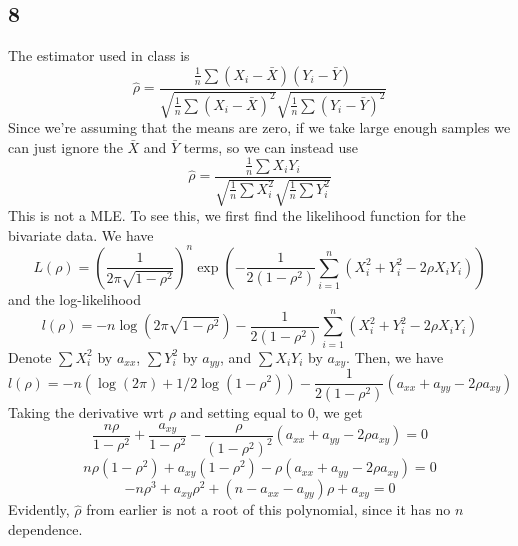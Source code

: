 \documentclass{article}
\begin{document}
\subsection*{8}
The estimator used in class is 
$$\hat{\rho}=\frac{\frac{1}{n}\sum(X_i-\bar{X})(Y_i-\bar{Y})}{\sqrt{\frac{1}{n}\sum(X_i-\bar{X})^2}\sqrt{\frac{1}{n}\sum(Y_i-\bar{Y})^2}}$$
Since we're assuming that the means are zero, if we take large enough samples we can just ignore the $\bar{X}$ and $\bar{Y}$ terms, so we can instead use 
$$\hat{\rho}=\frac{\frac{1}{n}\sum X_iY_i}{\sqrt{\frac{1}{n}\sum X_i^2}\sqrt{\frac{1}{n}\sum Y_i^2}}$$
This is not a MLE. To see this, we first find the likelihood function for the bivariate data. We have 
$$L(\rho)=\left(\frac{1}{2\pi\sqrt{1-\rho^2}}\right)^n\exp\left(-\frac{1}{2(1-\rho^2)}\sum_{i=1}^n(X_i^2+Y_i^2-2\rho X_iY_i)\right)$$
and the log-likelihood
$$l(\rho)=-n\log(2\pi\sqrt{1-\rho^2})-\frac{1}{2(1-\rho^2)}\sum_{i=1}^n(X_i^2+Y_i^2-2\rho X_iY_i)$$
Denote $\sum X_i^2$ by $a_{xx}$, $\sum Y_i^2$ by $a_{yy}$, and $\sum X_iY_i$ by $a_{xy}$. Then, we have
$$l(\rho)=-n(\log(2\pi)+1/2\log(1-\rho^2))-\frac{1}{2(1-\rho^2)}(a_{xx}+a_{yy}-2\rho a_{xy})$$
Taking the derivative wrt $\rho$ and setting equal to $0$, we get
$$\frac{n\rho}{1-\rho^2}+\frac{a_{xy}}{1-\rho^2}-\frac{\rho}{(1-\rho^2)^2}(a_{xx}+a_{yy}-2\rho a_{xy})=0$$
$$n\rho(1-\rho^2)+a_{xy}(1-\rho^2)-\rho(a_{xx}+a_{yy}-2\rho a_{xy})=0$$
$$-n\rho^3+a_{xy}\rho^2+(n-a_{xx}-a_{yy})\rho+a_{xy}=0$$
Evidently, $\hat{\rho}$ from earlier is not a root of this polynomial, since it has no $n$ dependence.
\end{document}
